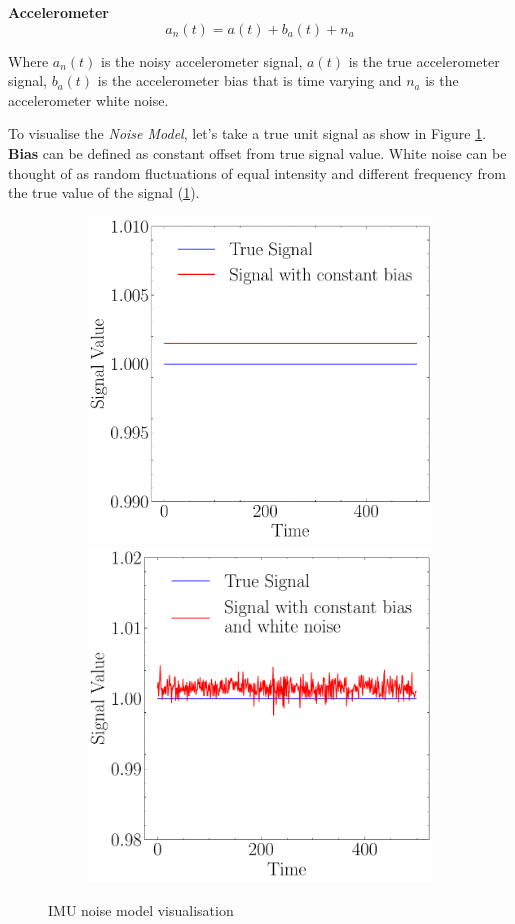 \textbf{Accelerometer}
\begin{equation}
    a_{n}(t) = a(t) + b_{a}(t) + n_{a}
\label{eqn:accel_noise}
\end{equation}

Where $ a_{n}(t) $ is the noisy accelerometer signal, $ a(t) $ is the true accelerometer signal, $ b_{a}(t) $ is the accelerometer bias that is time varying and $ n_{a} $ is the accelerometer white noise.

To visualise the \textit{Noise Model}, let's take a true unit signal as show in Figure \ref{fig:imu_noise}. \textbf{Bias} can be defined as constant offset from true signal value. White noise can be thought of as random fluctuations of equal intensity and different frequency from the true value of the signal (\ref{fig:imu_noise}).

\begin{figure}[H]
  \begin{subfigure}{\linewidth}
  \includegraphics[width=.5\linewidth]{images/fig_chapter2/noise_figs/signal_with_bias.pdf}\hfill
  \includegraphics[width=.5\linewidth]{images/fig_chapter2/noise_figs/signal_with_bias_and_noise.pdf}
  \end{subfigure}\par\medskip
  \caption{IMU noise model visualisation}
\label{fig:imu_noise}
\end{figure}

